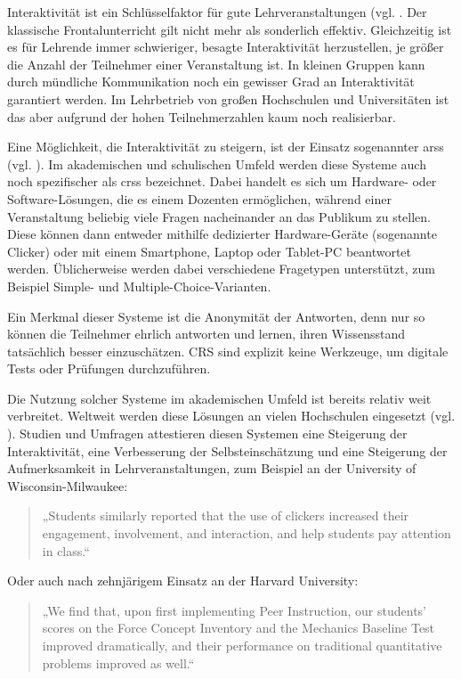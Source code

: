 Interaktivität ist ein Schlüsselfaktor für gute Lehrveranstaltungen (vgl. \cite[S. 1]{art:ieee}. Der klassische Frontalunterricht gilt nicht mehr als sonderlich effektiv. Gleichzeitig ist es für Lehrende immer schwieriger, besagte Interaktivität herzustellen, je größer die Anzahl der Teilnehmer einer Veranstaltung ist. In kleinen Gruppen kann durch mündliche Kommunikation noch ein gewisser Grad an Interaktivität garantiert werden. Im Lehrbetrieb von großen Hochschulen und Universitäten ist das aber aufgrund der hohen Teilnehmerzahlen kaum noch realisierbar.


Eine Möglichkeit, die Interaktivität zu steigern, ist der Einsatz sogenannter \acp{ars} (vgl. \cite[S. 5]{art:ieee}). Im akademischen und schulischen Umfeld werden diese Systeme auch noch spezifischer als \acp{crs} bezeichnet. Dabei handelt es sich um Hardware- oder Software-Lösungen, die es einem Dozenten ermöglichen, während einer Veranstaltung beliebig viele Fragen nacheinander an das Publikum zu stellen. Diese können dann entweder mithilfe dedizierter Hardware-Geräte (sogenannte Clicker) oder mit einem Smartphone, Laptop oder Tablet-PC beantwortet werden. Üblicherweise werden dabei verschiedene Fragetypen unterstützt, zum Beispiel Simple- und Multiple-Choice-Varianten.

Ein Merkmal dieser Systeme ist die Anonymität der Antworten, denn nur so können die Teilnehmer ehrlich antworten und lernen, ihren Wissensstand tatsächlich besser einzuschätzen. CRS sind explizit keine Werkzeuge, um digitale Tests oder Prüfungen durchzuführen.

Die Nutzung solcher Systeme im akademischen Umfeld ist bereits relativ weit verbreitet. Weltweit werden diese Lösungen an vielen Hochschulen eingesetzt (vgl. \cite{web:elanwiki}). Studien und Umfragen attestieren diesen Systemen eine Steigerung der Interaktivität, eine Verbesserung der Selbsteinschätzung und eine Steigerung der Aufmerksamkeit in Lehrveranstaltungen, zum Beispiel an der University of Wisconsin-Milwaukee\cite[S. 5]{paper:wisconsin_clicker}:

\begin{quote}
„Students similarly reported that the use of clickers increased their engagement, involvement, and interaction, and help students pay attention in class.“
\end{quote}

Oder auch nach zehnjärigem Einsatz an der Harvard University\cite[S. 6]{paper:harvard_tenyears}:

\begin{quote}
„We find that, upon first implementing Peer Instruction, our students’ scores on the Force Concept Inventory and the Mechanics Baseline Test improved dramatically, and their performance on traditional quantitative problems improved as well.“
\end{quote}


